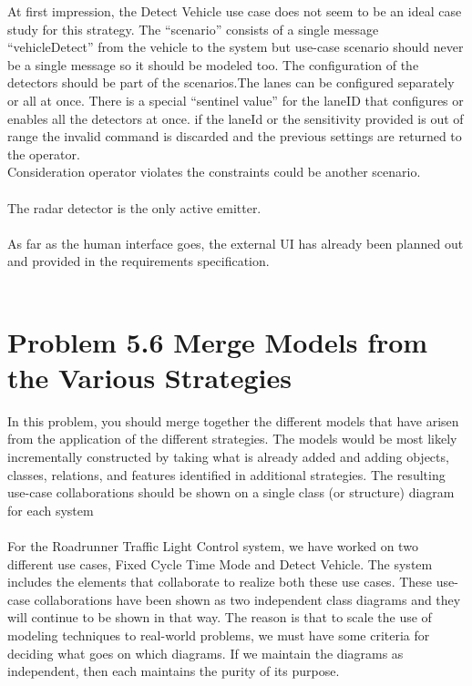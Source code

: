 \documentclass[12pt,a4paper]{article}
\begin{document}
At first impression, the Detect Vehicle use case does not seem to be an ideal case study for this strategy. The “scenario” consists of a single message “vehicleDetect” from the vehicle to the system but use-case scenario should never be a single message so it should be modeled too. The configuration of the detectors should be part of the scenarios.The lanes can be configured separately or all at once. There is a special “sentinel value” for the laneID that configures or enables all the detectors at once. if the laneId or the sensitivity provided is out of range the invalid
command is discarded and the previous settings are returned to the operator.\\
Consideration operator violates the constraints could be another scenario. 
\\\\
The radar detector is the only active emitter.
\\\\
As far as the human interface goes, the external UI has already been planned out and provided in the requirements specification.
\\\\


\section{Problem 5.6 Merge Models from the Various Strategies}
In this problem, you should merge together the different models that
have arisen from the application of the different strategies. The models would be most likely incrementally constructed by taking what is already added and adding objects, classes, relations, and features identified in additional strategies. The resulting use-case collaborations should be shown on a single
class (or structure) diagram for each system \\ \\

For the Roadrunner Traffic Light Control system, we have worked on two different use cases, Fixed Cycle Time Mode and Detect Vehicle. The system includes the elements that collaborate to realize both these use cases.  These use-case collaborations have been shown as two independent class diagrams and they will
continue to be shown in that way. The reason is that to scale the use of modeling techniques to real-world problems,
we must have some criteria for deciding what goes on which diagrams. If we maintain the diagrams as independent, then each maintains the purity of its purpose. \\ \\
\end{document}
